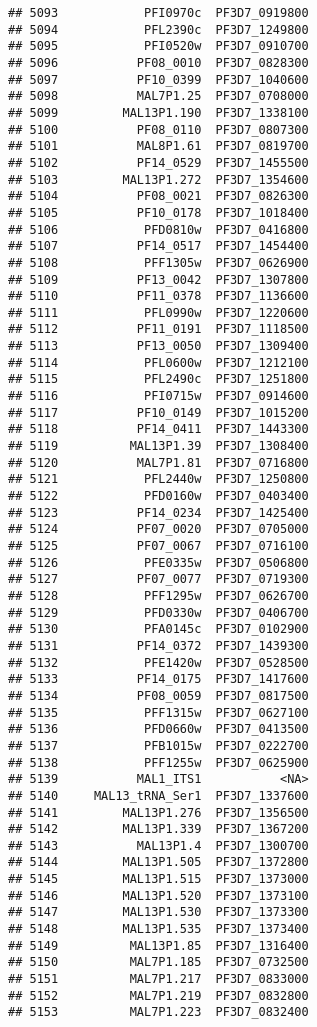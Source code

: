 \documentclass[12pt, a4paper]{article}\usepackage[]{graphicx}\usepackage[]{color}
\makeatletter
\newenvironment{kframe}{%
 \def\at@end@of@kframe{}%
 \ifinner\ifhmode%
  \def\at@end@of@kframe{\end{minipage}}%
  \begin{minipage}{\columnwidth}%
 \fi\fi%
 \def\FrameCommand##1{\hskip\@totalleftmargin \hskip-\fboxsep
 \colorbox{shadecolor}{##1}\hskip-\fboxsep
     \hskip-\linewidth \hskip-\@totalleftmargin \hskip\columnwidth}%
 \MakeFramed {\advance\hsize-\width
   \@totalleftmargin\z@ \linewidth\hsize
   \@setminipage}}%
 {\par\unskip\endMakeFramed%
 \at@end@of@kframe}
\newenvironment{knitrout}{}{} %
\makeatother
\begin{document}
\begin{knitrout}
\begin{kframe}
\begin{verbatim}
## 5093            PFI0970c  PF3D7_0919800
## 5094            PFL2390c  PF3D7_1249800
## 5095            PFI0520w  PF3D7_0910700
## 5096           PF08_0010  PF3D7_0828300
## 5097           PF10_0399  PF3D7_1040600
## 5098           MAL7P1.25  PF3D7_0708000
## 5099         MAL13P1.190  PF3D7_1338100
## 5100           PF08_0110  PF3D7_0807300
## 5101           MAL8P1.61  PF3D7_0819700
## 5102           PF14_0529  PF3D7_1455500
## 5103         MAL13P1.272  PF3D7_1354600
## 5104           PF08_0021  PF3D7_0826300
## 5105           PF10_0178  PF3D7_1018400
## 5106            PFD0810w  PF3D7_0416800
## 5107           PF14_0517  PF3D7_1454400
## 5108            PFF1305w  PF3D7_0626900
## 5109           PF13_0042  PF3D7_1307800
## 5110           PF11_0378  PF3D7_1136600
## 5111            PFL0990w  PF3D7_1220600
## 5112           PF11_0191  PF3D7_1118500
## 5113           PF13_0050  PF3D7_1309400
## 5114            PFL0600w  PF3D7_1212100
## 5115            PFL2490c  PF3D7_1251800
## 5116            PFI0715w  PF3D7_0914600
## 5117           PF10_0149  PF3D7_1015200
## 5118           PF14_0411  PF3D7_1443300
## 5119          MAL13P1.39  PF3D7_1308400
## 5120           MAL7P1.81  PF3D7_0716800
## 5121            PFL2440w  PF3D7_1250800
## 5122            PFD0160w  PF3D7_0403400
## 5123           PF14_0234  PF3D7_1425400
## 5124           PF07_0020  PF3D7_0705000
## 5125           PF07_0067  PF3D7_0716100
## 5126            PFE0335w  PF3D7_0506800
## 5127           PF07_0077  PF3D7_0719300
## 5128            PFF1295w  PF3D7_0626700
## 5129            PFD0330w  PF3D7_0406700
## 5130            PFA0145c  PF3D7_0102900
## 5131           PF14_0372  PF3D7_1439300
## 5132            PFE1420w  PF3D7_0528500
## 5133           PF14_0175  PF3D7_1417600
## 5134           PF08_0059  PF3D7_0817500
## 5135            PFF1315w  PF3D7_0627100
## 5136            PFD0660w  PF3D7_0413500
## 5137            PFB1015w  PF3D7_0222700
## 5138            PFF1255w  PF3D7_0625900
## 5139           MAL1_ITS1           <NA>
## 5140     MAL13_tRNA_Ser1  PF3D7_1337600
## 5141         MAL13P1.276  PF3D7_1356500
## 5142         MAL13P1.339  PF3D7_1367200
## 5143           MAL13P1.4  PF3D7_1300700
## 5144         MAL13P1.505  PF3D7_1372800
## 5145         MAL13P1.515  PF3D7_1373000
## 5146         MAL13P1.520  PF3D7_1373100
## 5147         MAL13P1.530  PF3D7_1373300
## 5148         MAL13P1.535  PF3D7_1373400
## 5149          MAL13P1.85  PF3D7_1316400
## 5150          MAL7P1.185  PF3D7_0732500
## 5151          MAL7P1.217  PF3D7_0833000
## 5152          MAL7P1.219  PF3D7_0832800
## 5153          MAL7P1.223  PF3D7_0832400

\end{verbatim}
\end{kframe}
\end{knitrout}
\end{document}
